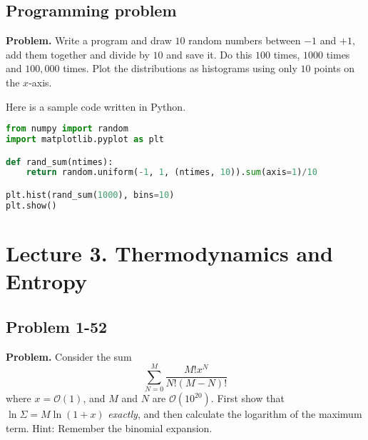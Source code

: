 \documentclass[twocolumn, 10pt]{article}
\numberwithin{equation}{section}
\newenvironment{problem}
{\par\medskip \color{problemblue}
  \textbf{Problem. }\ignorespaces}
{\medskip}
\newenvironment{solution}[1][\empty]
{\par\medskip\sffamily
  \textbf{\ifx\empty#1{Solution.}\relax\else{#1}\fi} \ignorespaces}
{\medskip}
\begin{document}
\subsection{Programming problem}

\begin{problem}
Write a program and draw $10$ random numbers between $-1$ and $+1$,
add them together and divide by $10$ and save it.
Do this $100$ times, $1000$ times and $100,000$ times.
Plot the distributions as histograms using only $10$ points on the $x$-axis.
\end{problem}

\begin{solution}
Here is a sample code written in Python.
%
\begin{lstlisting}[language=Python]
from numpy import random
import matplotlib.pyplot as plt

def rand_sum(ntimes):
    return random.uniform(-1, 1, (ntimes, 10)).sum(axis=1)/10

plt.hist(rand_sum(1000), bins=10)
plt.show()
\end{lstlisting}
%
\end{solution}




\section{Lecture 3. Thermodynamics and Entropy}

\subsection{Problem 1-52}

\begin{problem}
  Consider the sum
  $$
  \sum_{N=0}^M \frac{ M! x^N } { N! (M-N)! }
  $$
  where $x = \mathcal O(1)$,
  and $M$ and $N$ are $\mathcal O(10^{20})$.
  First show that
  $\ln\Sigma = M \ln(1+x)$
  \emph{exactly}, and then calculate
  the logarithm of the maximum term.
  Hint: Remember the binomial expansion.
\end{problem}
\end{document}
